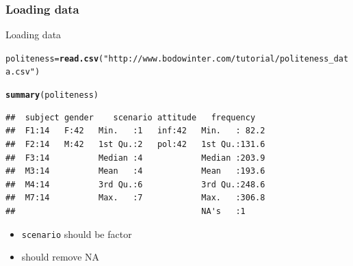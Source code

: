 \documentclass[10p]{beamer}\usepackage[]{graphicx}\usepackage[]{color}
\makeatletter
\newcommand{\hlstr}[1]{\textcolor[rgb]{0.192,0.494,0.8}{#1}}%
\newcommand{\hlstd}[1]{\textcolor[rgb]{0.345,0.345,0.345}{#1}}%
\newcommand{\hlkwb}[1]{\textcolor[rgb]{0.69,0.353,0.396}{#1}}%
\newcommand{\hlkwd}[1]{\textcolor[rgb]{0.737,0.353,0.396}{\textbf{#1}}}%
\newenvironment{kframe}{%
 \def\at@end@of@kframe{}%
 \ifinner\ifhmode%
  \def\at@end@of@kframe{\end{minipage}}%
  \begin{minipage}{\columnwidth}%
 \fi\fi%
 \def\FrameCommand##1{\hskip\@totalleftmargin \hskip-\fboxsep
 \colorbox{shadecolor}{##1}\hskip-\fboxsep
     \hskip-\linewidth \hskip-\@totalleftmargin \hskip\columnwidth}%
 \MakeFramed {\advance\hsize-\width
   \@totalleftmargin\z@ \linewidth\hsize
   \@setminipage}}%
 {\par\unskip\endMakeFramed%
 \at@end@of@kframe}
\newenvironment{knitrout}{}{} %
\makeatother
\begin{document}
\begin{frame}[fragile]
\frametitle{Loading data}
Loading data
\begin{knitrout}\scriptsize
{}\color{fgcolor}\begin{kframe}
\begin{alltt}
\hlstd{politeness}\hlkwb{=}\hlkwd{read.csv}\hlstd{(}\hlstr{"http://www.bodowinter.com/tutorial/politeness_data.csv"}\hlstd{)}
\end{alltt}
\end{kframe}
\end{knitrout}
\begin{knitrout}\scriptsize
{}\color{fgcolor}\begin{kframe}
\begin{alltt}
\hlkwd{summary}\hlstd{(politeness)}
\end{alltt}
\begin{verbatim}
##  subject gender    scenario attitude   frequency    
##  F1:14   F:42   Min.   :1   inf:42   Min.   : 82.2  
##  F2:14   M:42   1st Qu.:2   pol:42   1st Qu.:131.6  
##  F3:14          Median :4            Median :203.9  
##  M3:14          Mean   :4            Mean   :193.6  
##  M4:14          3rd Qu.:6            3rd Qu.:248.6  
##  M7:14          Max.   :7            Max.   :306.8  
##                                      NA's   :1
\end{verbatim}
\end{kframe}
\end{knitrout}
\begin{itemize}
\item \texttt{scenario} should be factor
\item should remove NA
\end{itemize}
\end{frame}
\end{document}
